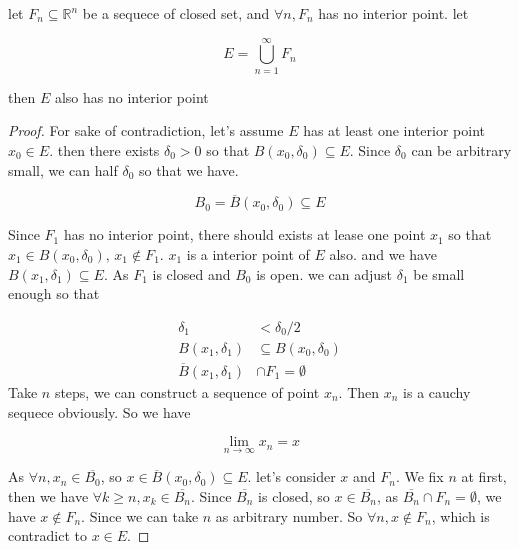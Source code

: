 \documentclass[11pt,a4paper]{article}
\begin{document}
\begin{thm}
    let $F_n \subseteq \mathbb{R}^n$ be a sequece of closed set, and $\forall n, F_n$ has no interior point. let 

    \[
        E = \bigcup_{n=1}^{\infty}F_n
    \]

    then $E$ also has no interior point
\end{thm}

\begin{proof}
    For sake of contradiction, let's assume $E$ has at least one interior point $x_0 \in E$. then there exists 
    $\delta_0 > 0$ so that $B(x_0, \delta_0) \subseteq E$. Since $\delta_0$ can be arbitrary small, we can half $\delta_0$ so that we have.

    \[
        B_0 = \overline{B}(x_0, \delta_0) \subseteq E
    \]
    
    Since $F_1$ has no interior point, there should exists at lease one point $x_1$ 
    so that $x_1 \in B(x_0, \delta_0),\, x_1 \notin F_1$. $x_1$ is a interior point of $E$ also. and we have $B(x_1, \delta_1) \subseteq E$. 
    As $F_1$ is closed and $B_0$ is open. we can adjust $\delta_1$ be small enough so that 
    
    \begin{align*}
      \delta_1 & < \delta_0 / 2  \\
    B(x_1, \delta_1) & \subseteq B(x_0, \delta_0) \\
    \overline{B}(x_1, \delta_1) & \cap F_1 = \emptyset
    \end{align*}
    Take
    $n$ steps, we can construct a sequence of point $x_n$. Then $x_n$ is a cauchy sequece obviously. So we have

    \[
        \lim_{n \to \infty}x_n = x
    \]

    As $\forall n, x_n \in \overline{B_0}$, so $x \in \overline{B}(x_0, \delta_0) \subseteq E$. let's consider $x$ and $F_n$. We fix $n$ at first,
    then we have $\forall k \ge n, x_k \in \overline{B_n}$. Since $\overline{B_n}$ is closed, so
    $x \in \overline{B_n}$, as $\overline{B_n} \cap F_n = \emptyset$, we have $x \notin F_n$. 
    Since we can take $n$ as arbitrary number. So $\forall n, x \notin F_n$, which is contradict to $x \in E$.

\end{proof}
\end{document}
